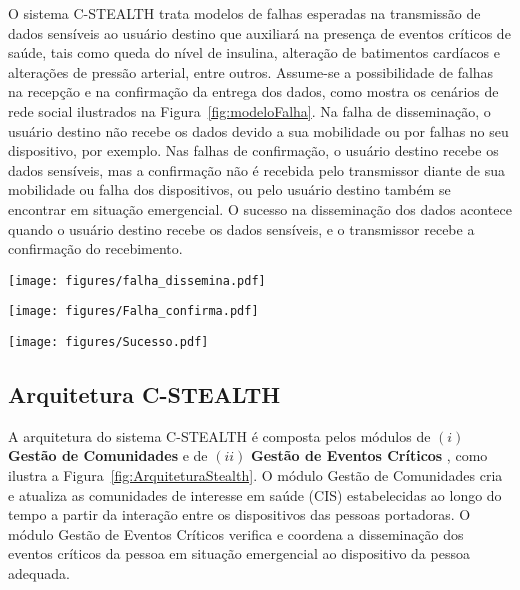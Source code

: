 \documentclass[12pt]{article}
\newcommand{\mn}[1]{\textcolor{red}{\bf [Michele]: #1}}
\begin{document}
O sistema \mbox{C-STEALTH} trata modelos de falhas esperadas na transmissão de dados sensíveis ao usuário destino que auxiliará na presença de eventos críticos de saúde,
tais como queda do nível de insulina, alteração de batimentos cardíacos e alterações de pressão arterial, entre outros.
Assume-se a possibilidade de falhas na recepção e na confirmação da entrega dos dados, como mostra os cenários de rede social ilustrados na Figura~\ref{fig:modeloFalha}. Na falha de disseminação, o usuário destino não recebe os dados
devido a
sua mobilidade ou por falhas no seu dispositivo, por exemplo. Nas falhas de confirmação, o usuário destino %
recebe os dados sensíveis, mas a confirmação não é recebida pelo transmissor
diante de sua
mobilidade ou falha dos dispositivos, ou pelo usuário destino também se encontrar em situação emergencial. %
O sucesso na disseminação dos dados acontece quando o usuário destino recebe os dados sensíveis, e o transmissor recebe
a confirmação do recebimento.

\begin{table}[!htb]
\centering
	\begin{minipage}[t]{0.32\linewidth}
		\texttt{[image: figures/falha\_dissemina.pdf]}
	\end{minipage}
	\begin{minipage}[t]{0.32\linewidth}
		\texttt{[image: figures/Falha\_confirma.pdf]}
	\end{minipage}
	\begin{minipage}[t]{0.32\linewidth}
		\texttt{[image: figures/Sucesso.pdf]}
	\end{minipage}
	\vspace{-8.0pt}
	\label{fig:modeloFalha}
\end{table}

\subsection{Arquitetura C-STEALTH}
\label{sec:stealth}

A arquitetura do sistema \mbox{C-STEALTH} é composta pelos módulos de $(i)$ {\bf Gestão de Comunidades} e de $(ii)$ {\bf Gestão de Eventos Críticos}%
, como ilustra a Figura~\ref{fig:ArquiteturaStealth}. O módulo Gestão de Comunidades %
cria e atualiza as comunidades de interesse em saúde (CIS) estabelecidas ao longo do tempo a partir da interação entre os dispositivos das pessoas portadoras. O módulo Gestão de Eventos Críticos verifica e coordena a disseminação dos eventos críticos da pessoa em situação emergencial ao dispositivo da pessoa adequada.
\end{document}

